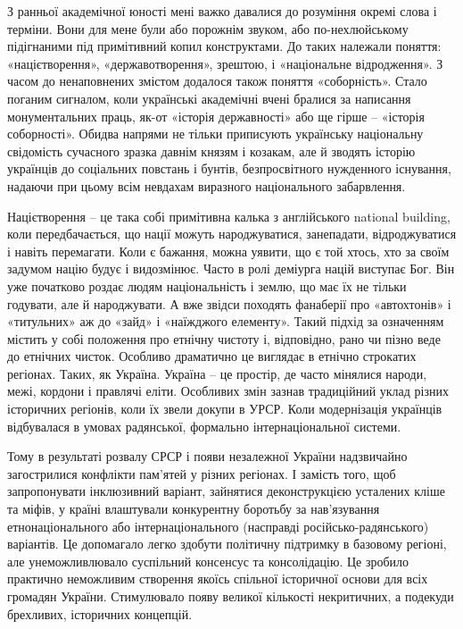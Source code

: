 З ранньої академічної юності мені важко давалися до розуміння окремі слова і
терміни. Вони для мене були або порожнім звуком, або по-нехлюйському
підігнаними під примітивний копил конструктами. До таких належали поняття:
«націєтворення», «державотворення», зрештою, і «національне відродження». З
часом до ненаповнених змістом додалося також поняття «соборність». Стало
поганим сигналом, коли українські академічні вчені бралися за написання
монументальних праць, як-от «історія державності» або ще гірше – «історія
соборності». Обидва напрями не тільки приписують українську національну
свідомість сучасного зразка давнім князям і козакам, але й зводять історію
українців до соціальних повстань і бунтів, безпросвітного нужденного існування,
надаючи при цьому всім невдахам виразного національного забарвлення.

Націєтворення – це така собі примітивна калька з англійського national
building, коли передбачається, що нації можуть народжуватися, занепадати,
відроджуватися і навіть перемагати. Коли є бажання, можна уявити, що є той
хтось, хто за своїм задумом націю будує і видозмінює. Часто в ролі деміурга
націй виступає Бог. Він уже початково роздає людям національність і землю, що
має їх не тільки годувати, але й народжувати. А вже звідси походять фанаберії
про «автохтонів» і «титульних» аж до «зайд» і «наїжджого елементу». Такий
підхід за означенням містить у собі положення про етнічну чистоту і,
відповідно, рано чи пізно веде до етнічних чисток. Особливо драматично це
виглядає в етнічно строкатих регіонах. Таких, як Україна. Україна – це простір,
де часто мінялися народи, межі, кордони і правлячі еліти. Особливих змін зазнав
традиційний уклад різних історичних регіонів, коли їх звели докупи в УРСР. Коли
модернізація українців відбувалася в умовах радянської, формально
інтернаціональної системи.

Тому в результаті розвалу СРСР і появи незалежної України надзвичайно загострилися конфлікти пам’ятей у різних регіонах. І замість того, щоб запропонувати інклюзивний варіант, зайнятися деконструкцією усталених кліше та міфів, у країні влаштували конкурентну боротьбу за нав’язування етнонаціонального або інтернаціонального (насправді російсько-радянського) варіантів. Це допомагало легко здобути політичну підтримку в базовому регіоні, але унеможливлювало суспільний консенсус та консолідацію. Це зробило практично неможливим створення якоїсь спільної історичної основи для всіх громадян України. Стимулювало появу великої кількості некритичних, а подекуди брехливих, історичних концепцій.

